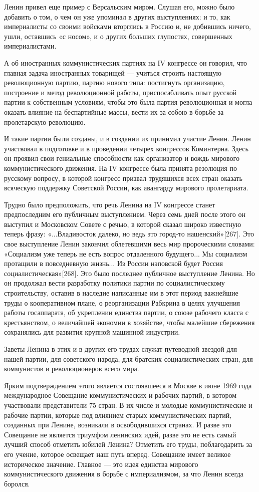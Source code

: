 \documentclass[12pt, a4paper, openany]{book}
\begin{document}
Ленин привел еще пример с Версальским миром. Слушая его, можно было добавить о том, о чем он уже упоминал в других выступлениях: и то, как империалисты со своими войсками вторглись в Россию и, не добившись ничего, ушли, оставшись «с носом», и о других больших глупостях, совершенных империалистами.

А об иностранных коммунистических партиях на IV конгрессе он говорил, что главная задача иностранных товарищей — учиться строить настоящую революционную партию, партию нового типа: постигнуть организацию, построение и метод революционной работы, приспосабливать опыт русской партии к собственным условиям, чтобы это была партия революционная и могла оказать влияние на беспартийные массы, вести их за собою в борьбе за пролетарскую революцию.

И такие партии были созданы, и в создании их принимал участие Ленин. Ленин участвовал в подготовке и в проведении четырех конгрессов Коминтерна. Здесь он проявил свои гениальные способности как организатор и вождь мирового коммунистического движения. На IV конгрессе была принята резолюция по русскому вопросу, в которой конгресс призвал трудящихся всех стран оказать всяческую поддержку Советской России, как авангарду мирового пролетариата.

Трудно было предположить, что речь Ленина на IV конгрессе станет предпоследним его публичным выступлением. Через семь дней после этого он выступил и Московском Совете с речью, в которой сказал широко известную теперь фразу: «...Владивосток далеко, но ведь это город-то нашенский»[267]. Это свое выступление Ленин закончил облетевшими весь мир пророческими словами: «Социализм уже теперь не есть вопрос отдаленного будущего... Мы социализм протащили в повседневную жизнь... Из России нэповской будет Россия социалистическая»[268]. Это было последнее публичное выступление Ленина. Но он продолжал вести разработку политики партии по социалистическому строительству, оставив в наследие написанные им в этот период важнейшие труды о кооперативном плане, о реорганизации Рабкрина в целях улучшения работы госаппарата, об укреплении единства партии, о союзе рабочего класса с крестьянством, о величайшей экономии в хозяйстве, чтобы малейшие сбережения сохранялись для развития крупной машинной индустрии.

Заветы Ленина в этих и в других его трудах служат путеводной звездой для нашей партии, для советского народа, для братских социалистических стран, для коммунистов и революционеров всего мира.

Ярким подтверждением этого является состоявшееся в Москве в июне 1969 года международное Совещание коммунистических и рабочих партий, в котором участвовали представители 75 стран. В их числе и молодые коммунистические и рабочие партии, которые под влиянием старых коммунистических партий, созданных при Ленине, возникали в освободившихся странах. И разве это Совещание не является триумфом ленинских идей, разве это не есть самый лучший способ отметить юбилей Ленина? Отметить его труды, поблагодарить за его учение, которое освещает наш путь вперед. Совещание имеет великое историческое значение. Главное — это идея единства мирового коммунистического движения в борьбе с империализмом, за что Ленин всегда боролся.
\end{document}
